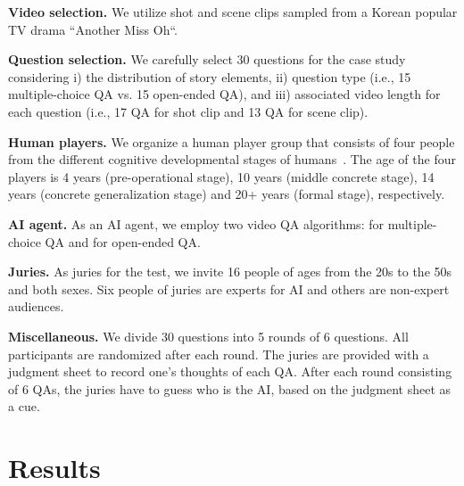 \documentclass[letterpaper]{article} %
\begin{document}
\noindent \textbf{Video selection.  } We utilize shot and scene clips sampled from a Korean popular TV drama ``Another Miss Oh``.

\noindent \textbf{Question selection.  } 
We carefully select 30 questions for the case study considering i) the distribution of story elements, ii) question type (i.e., 15 multiple-choice QA vs. 15 open-ended QA), and iii) associated video length for each question (i.e., 17 QA for shot clip and 13 QA for scene clip).

\noindent \textbf{Human players.  } 
We organize a human player group that consists of four people from the different cognitive developmental stages of humans~\cite{hierarchicalQnA2019heo}. The age of the four players is 4 years (pre-operational stage), 10 years (middle concrete stage), 14 years (concrete generalization stage) and 20+ years (formal stage), respectively.

\noindent \textbf{AI agent.  } 
As an AI agent, we employ two video QA algorithms: \cite{choi2021dramaqa} for multiple-choice QA and \cite{lee2021mounting} for open-ended QA. 

\noindent \textbf{Juries.  } 
As juries for the test, we invite 16 people of ages from the 20s to the 50s and both sexes. Six people of juries are experts for AI and others are non-expert audiences.

\noindent \textbf{Miscellaneous.  } 
We divide 30 questions into 5 rounds of 6 questions. All participants are randomized after each round.
The juries are provided with a judgment sheet to record one's thoughts of each QA. After each round consisting of 6 QAs, the juries have to guess who is the AI, based on the judgment sheet as a cue.

\section{Results}
\end{document}
